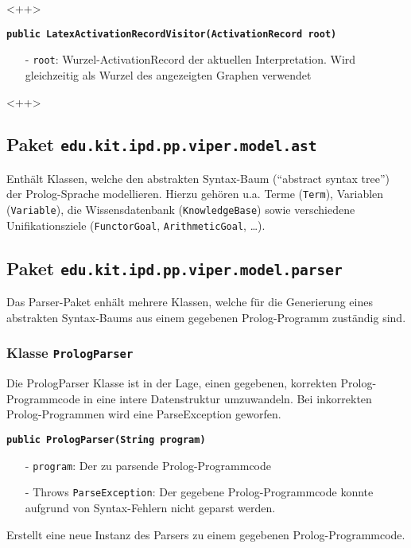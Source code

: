 \documentclass[parskip=full,11pt,twoside]{scrartcl}
\begin{document}
<++>

\textbf{\texttt{public LatexActivationRecordVisitor(ActivationRecord root)}}
\begin{itemize}[noitemsep]
	\item[-] \texttt{root}: Wurzel-ActivationRecord der aktuellen Interpretation. Wird gleichzeitig als Wurzel des angezeigten Graphen verwendet
\end{itemize}
<++>

\subsection{Paket \texttt{edu.kit.ipd.pp.viper.model.ast}}

Enthält Klassen, welche den abstrakten Syntax-Baum (\enquote{abstract syntax tree}) der Prolog-Sprache modellieren. Hierzu gehören u.a. Terme (\texttt{Term}), Variablen (\texttt{Variable}), die Wissensdatenbank (\texttt{KnowledgeBase}) sowie verschiedene Unifikationsziele (\texttt{FunctorGoal}, \texttt{ArithmeticGoal}, \dots).

\subsection{Paket \texttt{edu.kit.ipd.pp.viper.model.parser}}

Das Parser-Paket enhält mehrere Klassen, welche für die Generierung eines abstrakten Syntax-Baums aus einem gegebenen Prolog-Programm zuständig sind.

\subsubsection{Klasse \texttt{PrologParser}}

Die PrologParser Klasse ist in der Lage, einen gegebenen, korrekten Prolog-Programmcode in eine intere Datenstruktur umzuwandeln. Bei inkorrekten Prolog-Programmen wird eine ParseException geworfen.

\textbf{\texttt{public PrologParser(String program)}}
\begin{itemize}[noitemsep]
	\item[-] \texttt{program}: Der zu parsende Prolog-Programmcode
	\item[-] Throws \texttt{ParseException}: Der gegebene Prolog-Programmcode konnte aufgrund von Syntax-Fehlern nicht geparst werden.
\end{itemize}
Erstellt eine neue Instanz des Parsers zu einem gegebenen Prolog-Programmcode.
\end{document}
